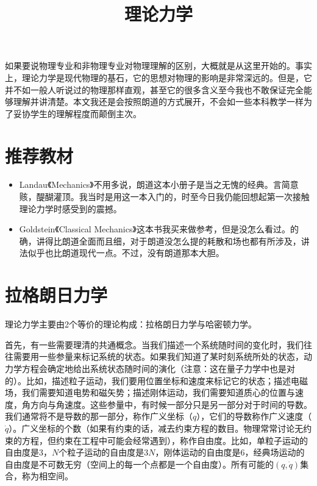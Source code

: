 \documentclass{ctexart}
\begin{document}
\title{理论力学}
\maketitle
\tableofcontents
如果要说物理专业和非物理专业对物理理解的区别，大概就是从这里开始的。事实上，理论力学是现代物理的基石，它的思想对物理的影响是非常深远的。但是，它并不如一般人听说过的物理那样直观，甚至它的很多含义至今我也不敢保证完全能够理解并讲清楚。本文我还是会按照朗道的方式展开，不会如一些本科教学一样为了妥协学生的理解程度而颠倒主次。

\section{推荐教材}

\begin{itemize}

\item Landau《Mechanics》不用多说，朗道这本小册子是当之无愧的经典。言简意赅，醍醐灌顶。我当时是用这一本入门的，时至今日我仍能回想起第一次接触理论力学时感受到的震撼。
\item Goldstein《Classical Mechanics》这本书我买来做参考，但是没怎么看过。的确，讲得比朗道全面而且细，对于朗道没怎么提的耗散和场也都有所涉及，讲法似乎也比朗道现代一点。不过，没有朗道那本大胆。

\end{itemize}

\section{拉格朗日力学}
理论力学主要由2个等价的理论构成：拉格朗日力学与哈密顿力学。

首先，有一些需要理清的共通概念。当我们描述一个系统随时间的变化时，我们往往需要用一些参量来标记系统的状态。如果我们知道了某时刻系统所处的状态，动力学方程会确定地给出系统状态随时间的演化（注意：这在量子力学中也是对的）。比如，描述粒子运动，我们要用位置坐标和速度来标记它的状态；描述电磁场，我们需要知道电势和磁矢势；描述刚体运动，我们需要知道质心的位置与速度，角方向与角速度。这些参量中，有时候一部分只是另一部分对于时间的导数。我们通常将不是导数的那一部分，称作广义坐标（$q$），它们的导数称作广义速度（$\dot{q}$）。广义坐标的个数（如果有约束的话，减去约束方程的数目。物理常常讨论无约束的方程，但约束在工程中可能会经常遇到），称作自由度。比如，单粒子运动的自由度是3，$N$个粒子运动的自由度是$3N$，刚体运动的自由度是6，经典场运动的自由度是不可数无穷（空间上的每一个点都是一个自由度）。所有可能的$(q,\dot{q})$集合，称为相空间。
\end{document}
